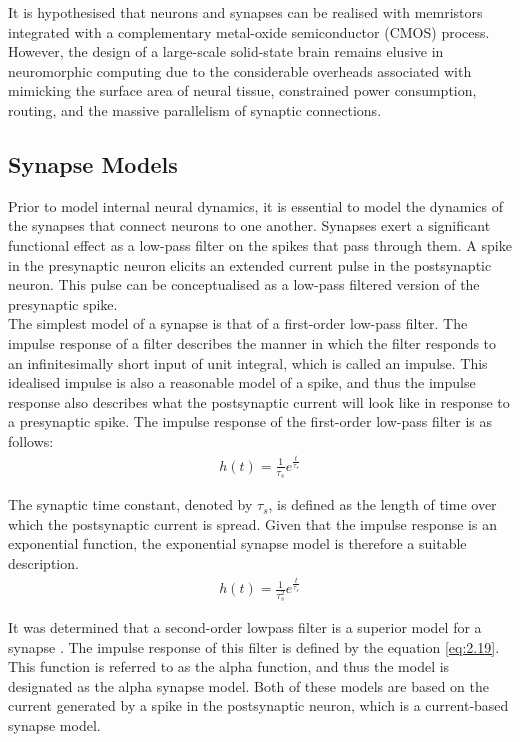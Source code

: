 \noindent It is hypothesised that neurons and synapses can be realised with memristors integrated with a complementary metal-oxide semiconductor (CMOS) process. However, the design of a large-scale solid-state brain remains elusive in neuromorphic computing due to the considerable overheads associated with mimicking the surface area of neural tissue, constrained power consumption, routing, and the massive parallelism of synaptic connections.

\subsection[Synapse Models]{Synapse Models}

Prior to model internal neural dynamics, it is essential to model the dynamics of the synapses that connect neurons to one another. Synapses exert a significant functional effect as a low-pass filter on the spikes that pass through them. A spike in the presynaptic neuron elicits an extended current pulse in the postsynaptic neuron. This pulse can be conceptualised as a low-pass filtered version of the presynaptic spike. \\

\noindent The simplest model of a synapse is that of a first-order low-pass filter. The impulse response of a filter describes the manner in which the filter responds to an infinitesimally short input of unit integral, which is called an impulse. This idealised impulse is also a reasonable model of a spike, and thus the impulse response also describes what the postsynaptic current will look like in response to a presynaptic spike. The impulse response of the first-order low-pass filter is as follows:
\begin{align}
h(t) = \frac{1}{\tau_s}e^{\frac{t}{\tau_s}} \label{eq:2.18} 
\end{align}

\noindent The synaptic time constant, denoted by $\tau_s$, is defined as the length of time over which the postsynaptic current is spread. Given that the impulse response is an exponential function, the exponential synapse model is therefore a suitable description.
\begin{align}
h(t) = \frac{1}{\tau_s^2}e^{\frac{t}{\tau_s}} \label{eq:2.19} 
\end{align}

\noindent It was determined that a second-order lowpass filter is a superior model for a synapse \cite{mainen1995reliability}. The impulse response of this filter is defined by the 
equation \ref{eq:2.19}. This function is referred to as the alpha function, and thus the model is designated as the alpha synapse model. Both of these models are based on the current generated by a spike in the postsynaptic neuron, which is a current-based synapse model.\\

